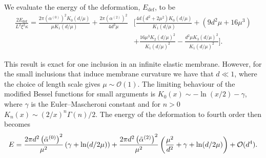 We evaluate the energy of the deformation, $E_{\text{def}}$, to be
\begin{equation}
\begin{split}
    \frac{2E_{\text{def}}}{L^2\xi^2\kappa} = \frac{2\pi\left(\alpha^{(0)}\right)^2 K_0\left(d/\mu\right)}{\mu K_1\left(d/\mu\right)} + \frac{2\pi\left(\alpha^{(2)}\right)^2}{4 d^3 \mu} &\Bigg[\frac{4d(d^2 + 2\mu^2)K_0\left(d/\mu\right)}{K_1\left(d/\mu\right)} + (9 d^2 \mu + 16\mu^3)\\
    &+ \frac{16\mu^3 K_2\left(d/\mu\right)^2}{K_1\left(d/\mu\right)^2} - \frac{d^2\mu K_3\left(d/\mu\right)^2}{K_1\left(d/\mu\right)^2}\Bigg].
\end{split}
\end{equation}

This result is exact for one inclusion in an infinite elastic membrane. However, for the small inclusions that induce membrane curvature we have that $d \ll 1$, where the choice of length scale gives $\mu\sim\mathcal{O}(1)$. The limiting behaviour of the modified Bessel functions for small arguments is $K_{0}(x) \sim -\ln(x/2)-\gamma$, where $\gamma$ is the Euler–Mascheroni constant and for $n > 0$ $K_{n}(x) \sim (2/x)^{n}\Gamma(n)/2$. The energy of the deformation to fourth order then becomes
\begin{equation}
    E = \frac{2\pi d^2 \left(\Tilde{\alpha}^{(0)}\right)^2}{\mu^2}\left( \gamma + \ln(d/2\mu) \right) + \frac{2\pi d^2 \left(\Tilde{\alpha}^{(2)}\right)^2}{\mu^2}\left(\frac{\mu^2}{d^2} + \gamma + \ln(d/2\mu) \right) + \mathcal{O}(d^4).
    \label{eq:SingleModQuad}
\end{equation}

